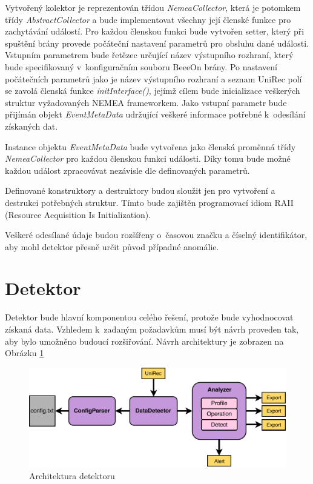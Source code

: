  Vytvořený kolektor je reprezentován třídou \textit{NemeaCollector}, která je potomkem třídy
 \textit{AbstractCollector} a bude implementovat všechny její členské funkce pro zachytávání událostí. Pro každou 
 členskou funkci  bude vytvořen setter, který při spuštění brány provede počáteční nastavení
 parametrů pro obsluhu dané 
 události. Vstupním parametrem bude řetězec určující název výstupního rozhraní, který bude
 specifikovaný
v~konfiguračním souboru BeeeOn brány. Po nastavení počátečních parametrů jako je název výstupního
 rozhraní a seznam UniRec polí se zavolá členská funkce \textit{initInterface()}, jejímž cílem bude inicializace
 veškerých struktur vyžadovaných NEMEA frameworkem.
 Jako vstupní parametr bude přijímán objekt \textit{EventMetaData} udržující veškeré informace potřebné 
 k~odesílání získaných dat.
 
 Instance objektu \textit{EventMetaData} bude vytvořena jako členská proměnná třídy \textit{NemeaCollector}
 pro každou členskou funkci události. Díky tomu bude možné každou událost zpracovávat nezávisle dle
 definovaných parametrů.
 
 Definované konstruktory a destruktory budou sloužit jen pro vytvoření a destrukci potřebných 
 struktur. Tímto bude zajištěn programovací idiom RAII (Resource Acquisition Is Initialization).
 
 Veškeré odesílané údaje budou rozšířeny o~časovou značku a číselný identifikátor, aby mohl detektor
 přesně určit původ případné anomálie.
 
 \newpage
 \section{Detektor}
 Detektor bude hlavní komponentou celého řešení, protože bude vyhodnocovat získaná data. Vzhledem
 k~zadaným požadavkům musí být návrh proveden tak, aby bylo umožněno budoucí rozšiřování. Návrh 
 architektury je zobrazen na Obrázku \ref{obr.detektor}
 \begin{figure}[ht]
   \begin{center}
   \includegraphics[scale=0.6]{pictures/detektor-arch}
   \caption{Architektura detektoru}
   \label{obr.detektor}
   \end{center}
   \end{figure}

